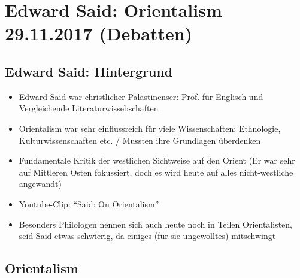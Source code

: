 \documentclass[emulatestandardclasses]{scrartcl}
\begin{document}
\section{Edward Said: Orientalism\\29.11.2017 (Debatten)}

\subsection{Edward Said: Hintergrund}

\begin{itemize}
  \item Edward Said war christlicher Palästinenser: Prof. für Englisch und Vergleichende Literaturwissebschaften
  \item Orientalism war sehr einflussreich für viele Wissenschaften: Ethnologie, Kulturwissenschaften etc. / Mussten ihre Grundlagen überdenken
  \item Fundamentale Kritik der westlichen Sichtweise auf den Orient (Er war sehr auf Mittleren Osten fokussiert, doch es wird heute auf alles nicht-westliche angewandt)
  \item Youtube-Clip: "`Said: On Orientalism"'
  \item Besonders Philologen nennen sich auch heute noch in Teilen Orientalisten, seid Said etwas schwierig, da einiges (für sie ungewolltes) mitschwingt
\end{itemize}

\subsection{Orientalism}
\end{document}
